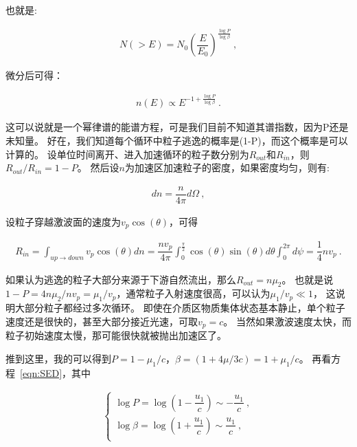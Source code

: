也就是:

\begin{equation}
    \begin{aligned}
      N(>E)=N_{0}\left(\dfrac{E}{E_{0}}\right)^{\frac{\log P}{\log \beta}} \ ,
    \end{aligned}
\end{equation}

微分后可得：

\begin{equation}
  \label{eqn:SED}
    \begin{aligned}
      n(E) \propto E^{-1+\frac{\log P}{\log \beta}} \ .
    \end{aligned}
\end{equation}

这可以说就是一个幂律谱的能谱方程，可是我们目前不知道其谱指数，因为P还是未知量。
好在，我们知道每个循环中粒子逃逸的概率是(1-P)，而这个概率是可以计算的。
设单位时间离开、进入加速循环的粒子数分别为$R_{out}$和$R_{in}$，则
$R_{out}/R_{in}=1-P$。
然后设$n$为加速区加速粒子的密度，如果密度均匀，则有:

\begin{equation}
    \begin{aligned}
      dn=\dfrac{n}{4 \pi} d \Omega \ ,
    \end{aligned}
\end{equation}

设粒子穿越激波面的速度为$v_p\cos(\theta)$，可得

\begin{equation}
    \begin{aligned}
      R_{i n}=\int_{u p \rightarrow d o w n} v_p \cos (\theta) d n =
      \dfrac{n v_p}{4 \pi} \int_{0}^{\frac{\pi}{2}} \cos (\theta) \sin (\theta)
      d \theta \int_{0}^{2 \pi} d \psi=\dfrac{1}{4} n v_p \ .
    \end{aligned}
\end{equation}

如果认为逃逸的粒子大部分来源于下游自然流出，那么$R_{out}=n\mu_2$。
也就是说$1-P=4n\mu_2/nv_p=\mu_1/v_p$，通常粒子入射速度很高，可以认为$\mu_1/v_p \ll 1$，
这说明大部分粒子都经过多次循环。
即使在介质区物质集体状态基本静止，单个粒子速度还是很快的，甚至大部分接近光速，可取$v_p=c$。
当然如果激波速度太快，而粒子初始速度太慢，那可能很快就被抛出加速区了。

推到这里，我的可以得到$P=1-\mu_1/c$，$\beta=(1+4\mu/3c)=1+\mu_1/c$。
再看方程~\ref{eqn:SED}，其中

\begin{equation}
  \label{eqn:index}
    \begin{aligned}
        \begin{cases}
          \log P=\log \left(1-\dfrac{u_{1}}{c}\right) \sim-\dfrac{u_{1}}{c} \ , \\

          \log \beta=\log \left(1+\dfrac{u_{1}}{c}\right) \sim \dfrac{u_{1}}{c} \ , \\
        \end{cases}
    \end{aligned}
\end{equation}


